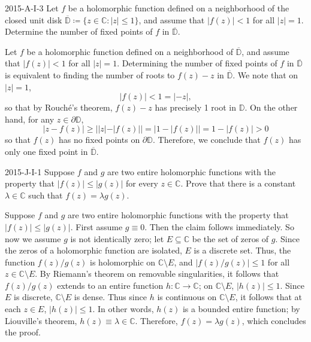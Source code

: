 \documentclass{article}
\begin{document}
	\begin{prb}{2015-A-I-3}
		Let $f$ be a holomorphic function defined on a neighborhood of the closed unit disk $\overline{\mathbb{D}} \coloneqq \{z \in \mathbb{C}: |z| \leq 1\}$, and assume that $|f(z)| < 1$ for all $|z| = 1$. Determine the number of fixed points of $f$ in $\overline{\mathbb{D}}$.  
	\end{prb}
	Let $f$ be a holomorphic function defined on a neighborhood of $\overline{\mathbb{D}}$, and assume that $|f(z)| < 1$ for all $|z| = 1$. Determining the number of fixed points of $f$ in $\overline{\mathbb{D}}$ is equivalent to finding the number of roots to $f(z) - z$ in $\overline{\mathbb{D}}$. We note that on $|z| = 1$, 
	\begin{equation*}
		|f(z)| < 1 = |-z|, 
	\end{equation*}
	so that by Rouch\'e's theorem, $f(z) -z$ has precisely 1 root in $\mathbb{D}$. On the other hand, for any $z \in \partial \mathbb{D}$, 
	\begin{equation*}
		|z - f(z)| \geq ||z| - |f(z)|| = |1 - |f(z)|| = 1 - |f(z)| > 0 
	\end{equation*}
	so that $f(z)$ has no fixed points on $\partial \mathbb{D}$. Therefore, we conclude that $f(z)$ has only one fixed point in $\overline{\mathbb{D}}$. 
	
	\begin{prb}{2015-J-I-1}
		Suppose $f$ and $g$ are two entire holomorphic functions with the property that $|f(z)| \leq |g(z)|$ for every $z \in \mathbb{C}$. Prove that there is a constant $\lambda \in \mathbb{C}$ such that $f(z) = \lambda g(z)$. 
	\end{prb}
	Suppose $f$ and $g$ are two entire holomorphic functions with the property that $|f(z)| \leq |g(z)|$. First assume $g \equiv 0$. Then the claim follows immediately. So now we assume $g$ is not identically zero; let $E \subseteq \mathbb{C}$ be the set of zeros of $g$. Since the zeros of a holomorphic function are isolated, $E$ is a discrete set. Thus, the function $f(z)/g(z)$ is holomorphic on $\mathbb{C}\setminus E$, and $|f(z)/g(z)| \leq 1$ for all $z \in \mathbb{C}\setminus E$. By Riemann's theorem on removable singularities, it follows that $f(z)/g(z)$ extends to an entire function $h: \mathbb{C} \to \mathbb{C}$; on $\mathbb{C}\setminus E$, $|h(z)| \leq 1$. Since $E$ is discrete, $\mathbb{C}\setminus E$ is dense. Thus since $h$ is continuous on $\mathbb{C}\setminus E$, it follows that at each $z \in E$, $|h(z)| \leq 1$. In other words, $h(z)$ is a bounded entire function; by Liouville's theorem, $h(z) \equiv \lambda \in \mathbb{C}$. Therefore, $f(z) = \lambda g(z)$, which concludes the proof. 
	
\end{document}
